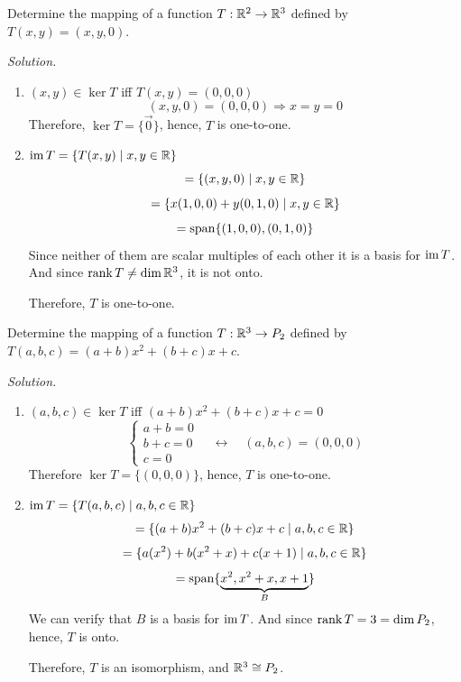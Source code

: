 \begin{example}
Determine the mapping of a function $T: \mathbb{R}^2 \to \mathbb{R}^3$ defined by $T(x, y) = (x, y, 0)$.

\textit{Solution.}

\begin{enumerate}[label=(\alph*)]
    \item $(x, y) \in \ker T$ iff $T(x, y) = (0, 0, 0)$
    $$(x, y, 0) = (0, 0, 0) \Longrightarrow x = y = 0$$
    Therefore, $\ker T = \{\vec{0}\}$, hence, $T$ is one-to-one.

    \item $\operatorname{im} T = \{T(x, y) \mid x, y \in \mathbb{R}\}$
    $$=\{(x, y, 0) \mid x, y \in \mathbb{R}\}$$
    $$=\{x(1, 0, 0) + y(0, 1, 0) \mid x, y \in \mathbb{R}\}$$
    $$=\operatorname{span}\{(1, 0, 0), (0, 1, 0)\}$$
    Since neither of them are scalar multiples of each other it is a basis for $\operatorname{im} T$. And since $\rank T \neq \dim \mathbb{R}^3$, it is not onto.

    Therefore, $T$ is one-to-one.
\end{enumerate}
\end{example}

\begin{example}
Determine the mapping of a function $T:\mathbb{R}^3 \to P_2$ defined by $T(a, b, c) = (a + b)x^2 + (b + c)x + c$.

\textit{Solution.}

\begin{enumerate}[label=(\alph*)]
    \item $(a, b, c) \in \ker T$ iff $(a + b)x^2 + (b + c)x + c = 0$
    $$\begin{cases}
        a + b = 0 \\
        b + c = 0 \\
        c = 0
    \end{cases} \quad \longleftrightarrow \quad (a, b, c) = (0, 0, 0)$$
    Therefore $\ker T = \{(0, 0, 0)\}$, hence, $T$ is one-to-one.

    \item $\operatorname{im} T = \{T(a, b, c) \mid a, b, c \in \mathbb{R}\}$
    $$=\{(a + b)x^2 + (b + c)x + c \mid a, b, c \in \mathbb{R}\}$$
    $$=\{a(x^2) + b(x^2 + x) + c(x + 1) \mid a, b, c \in \mathbb{R}\}$$
    $$=\operatorname{span}\{\underbrace{x^2, x^2 + x, x + 1}_B\}$$
    We can verify that $B$ is a basis for $\operatorname{im} T$. And since $\rank T = 3 = \dim P_2$, hence, $T$ is onto.

    Therefore, $T$ is an isomorphism, and $\mathbb{R}^3 \cong P_2$.
\end{enumerate}
\end{example}

